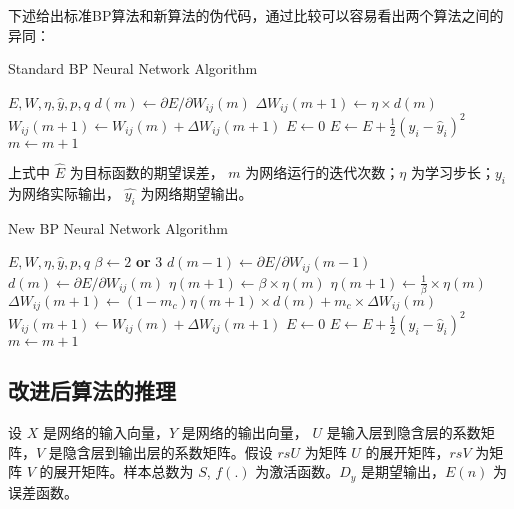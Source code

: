 \documentclass[UTF8]{ctexart}
\begin{document}
下述给出标准BP算法和新算法的伪代码，通过比较可以容易看出两个算法之间的异同：

\begin{algorithm}
\caption{Standard BP Neural Network Algorithm}  
\label{alg: Standard BP Neural Network Algorithm} 
\begin{algorithmic} [1] 
\State $E, W, \eta, \hat{y}, p, q$
			\State $d(m) \gets {\partial E} / {\partial W_{ij}(m)}$
			\State $\Delta W_{ij} (m+1) \gets \eta \times d(m)$
			\State $W_{ij} (m+1) \gets W_{ij} (m) + \Delta W_{ij} (m+1)$	
		\EndFor
	\EndFor
	\State $E \gets 0$
		\State $E \gets E + \frac{1}{2} (y_i - \hat{y}_i)^2$
	\EndFor
	\State $m \gets m + 1$
\EndWhile
\end{algorithmic}
\end{algorithm}

上式中 $\hat{E}$ 为目标函数的期望误差， $m$ 为网络运行的迭代次数；$\eta$ 为学习步长；$y_i$ 为网络实际输出， $\hat{y_i}$ 为网络期望输出。

\begin{algorithm}
\caption{New BP Neural Network Algorithm}  
\label{alg: New BP Neural Network Algorithm} 
\begin{algorithmic} [1] 
\State $E, W, \eta, \hat{y}, p, q$
\State $\beta \gets 2 $ \textbf{or} $3$
			\State $d(m-1) \gets {\partial E} / {\partial W_{ij}(m-1)}$
			\State $d(m) \gets {\partial E} / {\partial W_{ij}(m)}$
				\State $\eta(m+1) \gets \beta \times \eta(m)$
			\Else
				\State $\eta(m+1) \gets \frac{1}{\beta} \times \eta(m)$
			\EndIf
			\State $\Delta W_{ij} (m+1) \gets (1-m_c) \eta(m+1) \times d(m) + m_c \times \Delta W_{ij} (m)$
			\State $W_{ij} (m+1) \gets W_{ij} (m) + \Delta W_{ij} (m+1)$	
		\EndFor
	\EndFor
	\State $E \gets 0$
		\State $E \gets E + \frac{1}{2} (y_i - \hat{y}_i)^2$
	\EndFor
	\State $m \gets m + 1$
\EndWhile
\end{algorithmic}
\end{algorithm}

\newpage

\subsection {改进后算法的推理}

\newpage

设 $X$ 是网络的输入向量，$Y$ 是网络的输出向量， $U$ 是输入层到隐含层的系数矩阵，$V$ 是隐含层到输出层的系数矩阵。假设 $rsU$ 为矩阵 $U$ 的展开矩阵，$rsV$ 为矩阵 $V$ 的展开矩阵。样本总数为 $S$, $f(.)$ 为激活函数。$D_y$ 是期望输出，$E(n)$ 为误差函数。 \par
\end{document}
